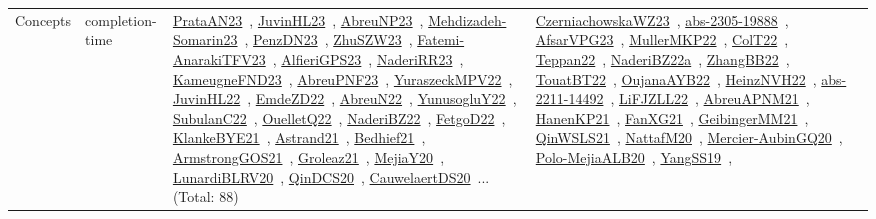 {\begin{longtable}{lp{3cm}>{\raggedright\arraybackslash}p{6cm}>{\raggedright\arraybackslash}p{6cm}>{\raggedright\arraybackslash}p{8cm}}
Concepts & completion-time & \href{works/PrataAN23.pdf}{PrataAN23}~\cite{PrataAN23}, \href{works/JuvinHL23.pdf}{JuvinHL23}~\cite{JuvinHL23}, \href{works/AbreuNP23.pdf}{AbreuNP23}~\cite{AbreuNP23}, \href{works/Mehdizadeh-Somarin23.pdf}{Mehdizadeh-Somarin23}~\cite{Mehdizadeh-Somarin23}, \href{works/PenzDN23.pdf}{PenzDN23}~\cite{PenzDN23}, \href{works/ZhuSZW23.pdf}{ZhuSZW23}~\cite{ZhuSZW23}, \href{works/Fatemi-AnarakiTFV23.pdf}{Fatemi-AnarakiTFV23}~\cite{Fatemi-AnarakiTFV23}, \href{works/AlfieriGPS23.pdf}{AlfieriGPS23}~\cite{AlfieriGPS23}, \href{works/NaderiRR23.pdf}{NaderiRR23}~\cite{NaderiRR23}, \href{works/KameugneFND23.pdf}{KameugneFND23}~\cite{KameugneFND23}, \href{works/AbreuPNF23.pdf}{AbreuPNF23}~\cite{AbreuPNF23}, \href{works/YuraszeckMPV22.pdf}{YuraszeckMPV22}~\cite{YuraszeckMPV22}, \href{works/JuvinHL22.pdf}{JuvinHL22}~\cite{JuvinHL22}, \href{works/EmdeZD22.pdf}{EmdeZD22}~\cite{EmdeZD22}, \href{works/AbreuN22.pdf}{AbreuN22}~\cite{AbreuN22}, \href{works/YunusogluY22.pdf}{YunusogluY22}~\cite{YunusogluY22}, \href{works/SubulanC22.pdf}{SubulanC22}~\cite{SubulanC22}, \href{works/OuelletQ22.pdf}{OuelletQ22}~\cite{OuelletQ22}, \href{works/NaderiBZ22.pdf}{NaderiBZ22}~\cite{NaderiBZ22}, \href{works/FetgoD22.pdf}{FetgoD22}~\cite{FetgoD22}, \href{works/KlankeBYE21.pdf}{KlankeBYE21}~\cite{KlankeBYE21}, \href{works/Astrand21.pdf}{Astrand21}~\cite{Astrand21}, \href{works/Bedhief21.pdf}{Bedhief21}~\cite{Bedhief21}, \href{works/ArmstrongGOS21.pdf}{ArmstrongGOS21}~\cite{ArmstrongGOS21}, \href{works/Groleaz21.pdf}{Groleaz21}~\cite{Groleaz21}, \href{works/MejiaY20.pdf}{MejiaY20}~\cite{MejiaY20}, \href{works/LunardiBLRV20.pdf}{LunardiBLRV20}~\cite{LunardiBLRV20}, \href{works/QinDCS20.pdf}{QinDCS20}~\cite{QinDCS20}, \href{works/CauwelaertDS20.pdf}{CauwelaertDS20}~\cite{CauwelaertDS20}... (Total: 88) & \href{works/CzerniachowskaWZ23.pdf}{CzerniachowskaWZ23}~\cite{CzerniachowskaWZ23}, \href{works/abs-2305-19888.pdf}{abs-2305-19888}~\cite{abs-2305-19888}, \href{works/AfsarVPG23.pdf}{AfsarVPG23}~\cite{AfsarVPG23}, \href{works/MullerMKP22.pdf}{MullerMKP22}~\cite{MullerMKP22}, \href{works/ColT22.pdf}{ColT22}~\cite{ColT22}, \href{works/Teppan22.pdf}{Teppan22}~\cite{Teppan22}, \href{works/NaderiBZ22a.pdf}{NaderiBZ22a}~\cite{NaderiBZ22a}, \href{works/ZhangBB22.pdf}{ZhangBB22}~\cite{ZhangBB22}, \href{works/TouatBT22.pdf}{TouatBT22}~\cite{TouatBT22}, \href{works/OujanaAYB22.pdf}{OujanaAYB22}~\cite{OujanaAYB22}, \href{works/HeinzNVH22.pdf}{HeinzNVH22}~\cite{HeinzNVH22}, \href{works/abs-2211-14492.pdf}{abs-2211-14492}~\cite{abs-2211-14492}, \href{works/LiFJZLL22.pdf}{LiFJZLL22}~\cite{LiFJZLL22}, \href{works/AbreuAPNM21.pdf}{AbreuAPNM21}~\cite{AbreuAPNM21}, \href{works/HanenKP21.pdf}{HanenKP21}~\cite{HanenKP21}, \href{works/FanXG21.pdf}{FanXG21}~\cite{FanXG21}, \href{works/GeibingerMM21.pdf}{GeibingerMM21}~\cite{GeibingerMM21}, \href{works/QinWSLS21.pdf}{QinWSLS21}~\cite{QinWSLS21}, \href{works/NattafM20.pdf}{NattafM20}~\cite{NattafM20}, \href{works/Mercier-AubinGQ20.pdf}{Mercier-AubinGQ20}~\cite{Mercier-AubinGQ20}, \href{works/Polo-MejiaALB20.pdf}{Polo-MejiaALB20}~\cite{Polo-MejiaALB20}, \href{works/YangSS19.pdf}{YangSS19}~\cite{YangSS19}, 
\end{longtable}}
